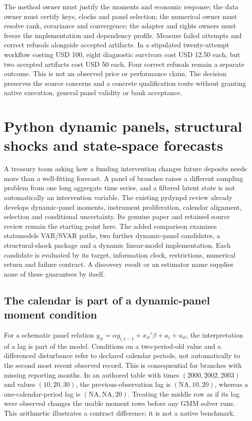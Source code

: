 The method owner must justify the moments and economic response; the data owner must
certify keys, clocks and panel selection; the numerical owner must resolve rank,
covariance and convergence; the adapter and rights owners must freeze the implementation
and dependency profile. Measure failed attempts and correct refusals alongside accepted
artifacts. In a stipulated twenty-attempt workflow costing USD 100, eight diagnostic
survivors cost USD 12.50 each, but two accepted artifacts cost USD 50 each. Four correct
refusals remain a separate outcome. This is not an observed price or performance claim.
The decision preserves the source concerns and a concrete qualification route without
granting native execution, general panel validity or bank acceptance.
\citep{exec24_pydynpd_reference}


\section[Python dynamic panels and shocks]{Python dynamic panels, structural shocks and state-space forecasts}
\label{sec:exec25-python-dynamic}

A treasury team asking how a funding intervention changes future deposits needs more than a well-fitting forecast. A panel of branches raises a different sampling problem from one long aggregate time series, and a filtered latent state is not automatically an intervention variable. The existing pydynpd review already develops dynamic-panel moments, instrument proliferation, calendar alignment, selection and conditional uncertainty. Its genuine paper and retained source review remain the starting point here. The added comparison examines statsmodels VAR/SVAR paths, two further dynamic-panel candidates, a structural-shock package and a dynamic linear-model implementation. Each candidate is evaluated by its target, information clock, restrictions, numerical return and failure contract. A discovery result or an estimator name supplies none of these guarantees by itself.~\citep{exec24_pydynpd_paper,exec24_pydynpd_source,exec25_pydyn_choice}

\subsection{The calendar is part of a dynamic-panel moment condition}

For a schematic panel relation $y_{it}=\alpha y_{i,t-1}+x_{it}'\beta+a_i+u_{it}$, the interpretation of a lag is part of the model. Conditions on a two-period-old value and a differenced disturbance refer to declared calendar periods, not automatically to the second most recent observed record. This is consequential for branches with missing reporting months. In an authored table with times $(2000,2002,2003)$ and values $(10,20,30)$, the previous-observation lag is $(\mathrm{NA},10,20)$, whereas a one-calendar-period lag is $(\mathrm{NA},\mathrm{NA},20)$. Treating the middle row as if its lag were observed changes the usable moment rows before any GMM solver runs. This arithmetic illustrates a contract difference; it is not a native benchmark.~\citep{exec24_pydynpd_source,exec25_pydyn_choice}

